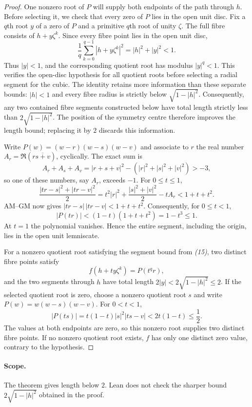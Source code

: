 \begin{proof}
One nonzero root of $P$ will supply both endpoints of the path through
$h$. Before selecting it, we check that every zero of $P$ lies in the
open unit disc. Fix a $q$th root $y$ of a zero of $P$ and a primitive
$q$th root of unity $\zeta$. The full fibre consists of $h+y\zeta^k$.  Since every fibre point
lies in the open unit disc,
\[
 \frac1q\sum_{k=0}^{q-1}|h+y\zeta^k|^2
   =|h|^2+|y|^2<1.                                \tag{14}
\]
Thus $|y|<1$, and the corresponding quotient root has modulus
$|y|^q<1$.  This verifies the open-disc hypothesis for all quotient roots
before selecting a radial segment for the cubic.
The identity retains more information than these separate bounds:
$|h|<1$ and every fibre radius is strictly below $\sqrt{1-|h|^2}$.
Consequently, any two contained fibre segments constructed below have total length
strictly less than $2\sqrt{1-|h|^2}$.  The position of the symmetry centre
therefore improves the length bound; replacing it by $2$ discards this information.

Write $P(w)=(w-r)(w-s)(w-v)$ and associate to $r$ the real number
$A_r=\Re(r\overline{s+v})$, cyclically.  The exact sum is
\[
 A_r+A_s+A_v=|r+s+v|^2-(|r|^2+|s|^2+|v|^2)>-3,
\]
so one of these numbers, say $A_r$, exceeds $-1$. For $0\le t\le1$,
\[
 \frac{|tr-s|^2+|tr-v|^2}{2}
 =t^2|r|^2+\frac{|s|^2+|v|^2}{2}-tA_r<1+t+t^2.
\]
AM--GM now gives $|tr-s|\,|tr-v|<1+t+t^2$.
Consequently, for $0\le t<1$,
\[
 |P(tr)|<(1-t)(1+t+t^2)=1-t^3\le1.              \tag{15}
\]
At $t=1$ the polynomial vanishes. Hence the entire segment, including
the origin, lies in the open unit lemniscate.

For a nonzero quotient root satisfying the segment bound from \emph{(15)}, two distinct
fibre points satisfy
\[
 f(h+ty\zeta^k)=P(t^qr),
\]
and the two segments through $h$ have total length
$2|y|<2\sqrt{1-|h|^2}\le2$.  If the selected
quotient root is zero, choose a nonzero quotient root $s$ and write
$P(w)=w(w-s)(w-v)$. For $0<t<1$,
\[
 |P(ts)|=t(1-t)|s|^2|ts-v|<2t(1-t)\le\frac12.
\]
The values at both endpoints are zero, so this nonzero root supplies
two distinct fibre points. If no nonzero quotient root exists, $f$ has
only one distinct zero value, contrary to the hypothesis.
\end{proof}

\paragraph{Scope.}
\label{rem:cubic-quotient-formal-boundary}
\label{bdry:solved-polynomial-families}
The theorem gives length below $2$. Lean does not check the sharper bound
$2\sqrt{1-|h|^2}$ obtained in the proof.

